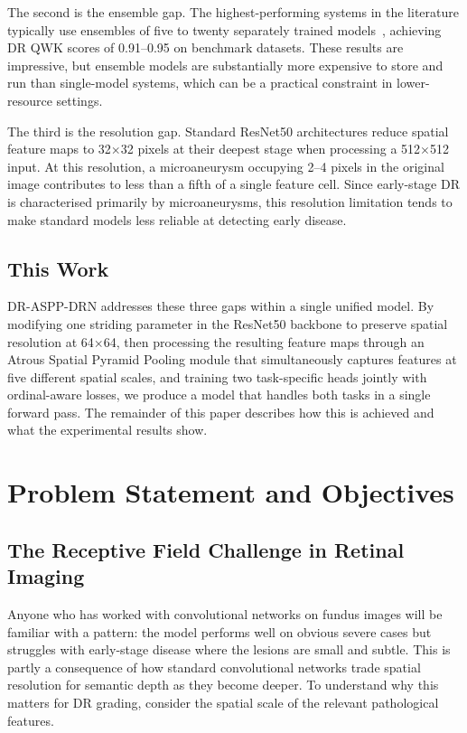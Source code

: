\documentclass[12pt,a4paper]{article}
\begin{document}
The second is the ensemble gap. The highest-performing systems in the literature typically use ensembles of five to twenty separately trained models~\cite{Tymchenko2020}, achieving DR QWK scores of 0.91--0.95 on benchmark datasets. These results are impressive, but ensemble models are substantially more expensive to store and run than single-model systems, which can be a practical constraint in lower-resource settings.

The third is the resolution gap. Standard ResNet50 architectures reduce spatial feature maps to 32$\times$32 pixels at their deepest stage when processing a 512$\times$512 input. At this resolution, a microaneurysm occupying 2--4 pixels in the original image contributes to less than a fifth of a single feature cell. Since early-stage DR is characterised primarily by microaneurysms, this resolution limitation tends to make standard models less reliable at detecting early disease.

\subsection{This Work}

DR-ASPP-DRN addresses these three gaps within a single unified model. By modifying one striding parameter in the ResNet50 backbone to preserve spatial resolution at 64$\times$64, then processing the resulting feature maps through an Atrous Spatial Pyramid Pooling module that simultaneously captures features at five different spatial scales, and training two task-specific heads jointly with ordinal-aware losses, we produce a model that handles both tasks in a single forward pass. The remainder of this paper describes how this is achieved and what the experimental results show.



\section{Problem Statement and Objectives}

\subsection{The Receptive Field Challenge in Retinal Imaging}

Anyone who has worked with convolutional networks on fundus images will be familiar with a pattern: the model performs well on obvious severe cases but struggles with early-stage disease where the lesions are small and subtle. This is partly a consequence of how standard convolutional networks trade spatial resolution for semantic depth as they become deeper. To understand why this matters for DR grading, consider the spatial scale of the relevant pathological features.
\end{document}
